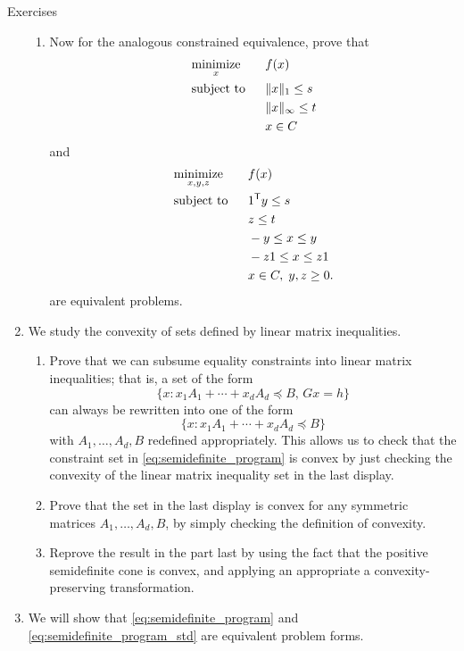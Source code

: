 \begin{xcb}{Exercises}
\begin{enumerate}[label=\thechapter.\arabic*]
\begin{enumerate}[label=\alph*.]
\item Now for the analogous constrained equivalence, prove that
  \begin{alignat*}{2}
  &\operatorname*{minimize}_x \quad && f(x) \\ 
  &\operatorname{subject\,\,to} && \|x\|_1 \leq s \\
  & && \|x\|_\infty \leq t \\
  & && x \in C
  \end{alignat*}
  and 
  \begin{alignat*}{2}
  &\operatorname*{minimize}_{x,y,z} \quad && f(x) \\  
  &\operatorname{subject\,\,to} && 1^{\mathsf{T}} y \leq s \\
  & && z \leq t \\
  & && -y \leq x \leq y \\
  & && -z1 \leq x \leq z1 \\
  & && x \in C, \; y,z \geq 0.
  \end{alignat*}
  are equivalent problems.
\end{enumerate}

\item \label{ex:linear_matrix_ineq}
  We study the convexity of sets defined by linear matrix inequalities. 

\begin{enumerate}[label=\alph*.]
\item Prove that we can subsume equality constraints into linear matrix
  inequalities; that is, a set of the form   
  \[
  \{x : x_1A_1 + \cdots + x_d A_d \preceq B, \, Gx = h\}
  \]
  can always be rewritten into one of the form 
  \[
  \{x : x_1A_1 + \cdots + x_d A_d \preceq B\}
  \]
  with $A_1,\ldots,A_d,B$ redefined appropriately. This allows us to check that
  the constraint set in \eqref{eq:semidefinite_program} is convex by just
  checking the convexity of the linear matrix inequality set in the last
  display.  

\item Prove that the set in the last display is convex for any symmetric
  matrices $A_1,\ldots,A_d,B$, by simply checking the definition of convexity.  

\item Reprove the result in the part last by using the fact that the positive 
  semidefinite cone is convex, and applying an appropriate a 
  convexity-preserving transformation.  
\end{enumerate}

\item \label{ex:semidefinite_program_std} 
  We will show that \eqref{eq:semidefinite_program} and
  \eqref{eq:semidefinite_program_std} are equivalent problem forms. 


\end{enumerate}
\end{xcb}
